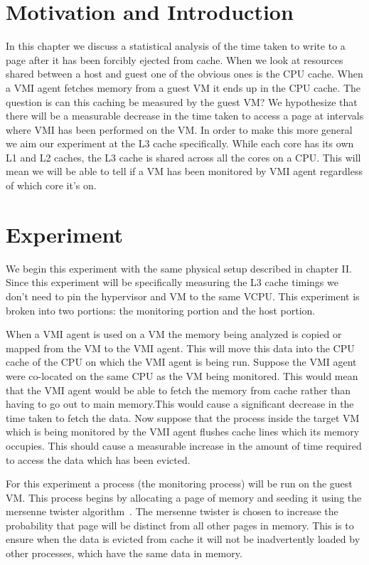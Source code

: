 
\section{Motivation and Introduction}
In this chapter we discuss a statistical analysis of the time taken to write to a page after it has been forcibly ejected from cache. When we look at resources shared between a host and guest one of the obvious ones is the CPU cache.  When a VMI agent fetches memory from a guest VM it ends up in the CPU cache. The question is can this caching be measured by the guest VM?  We hypothesize that there will be a measurable decrease in the time taken to access a page at intervals where VMI has been performed on the VM. In order to make this more general we aim our experiment at the L3 cache specifically. While each core has its own L1 and L2 caches, the L3 cache is shared across all the cores on a CPU.  This will mean we will be able to tell if a VM has been monitored by VMI agent regardless of which core it's on. 


\section{Experiment}

We begin this experiment with the same physical setup described in chapter II.   Since this experiment will be specifically measuring the L3 cache timings we don't need to pin the hypervisor and VM to the same VCPU. This experiment is broken into two portions: the monitoring portion and the host portion. 

When a VMI agent is used on a VM the memory being analyzed is copied or mapped from the VM to the VMI agent. This will move this data into the CPU cache of the CPU  on which the VMI agent is being run. Suppose the VMI agent were co-located on the same CPU as the VM being monitored. This would mean that the VMI agent would be able to fetch the memory from cache rather than having to go out to main memory.This would cause a significant decrease in the time taken to fetch the data.  Now suppose that the process inside the target VM which is being monitored by the VMI agent flushes cache lines which its memory occupies. This should cause a measurable increase in the amount of time required to access the data which has been evicted. 

For this experiment a process (the monitoring process) will be run on the guest VM. This process begins by allocating a page of memory and seeding it using the mersenne twister algorithm~\cite{matsumoto_mersenne_1998}. The mersenne twister is chosen to increase the probability that page will be distinct from all other pages in memory. This is to ensure when the data is evicted from cache it will not be inadvertently loaded by other processes, which have the same data in memory. 


